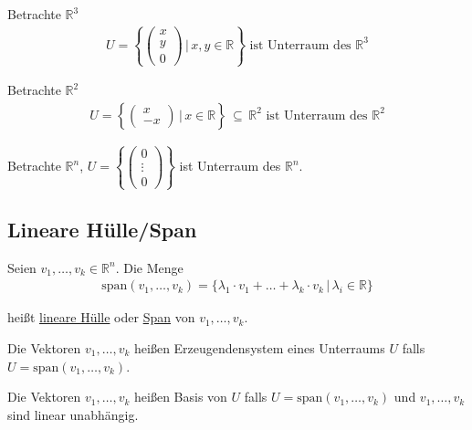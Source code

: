 Betrachte $\mathbb{R}^3$
\begin{align*}
	U = \left\{\begin{pmatrix}x \\ y \\ 0\end{pmatrix}\,\Bigg|\,x,y \in \mathbb{R}\right\}\text{ ist Unterraum des }\mathbb{R}^3
\end{align*}

Betrachte $\mathbb{R}^2$
\begin{align*}
	U = \left\{\begin{pmatrix}x \\ -x\end{pmatrix}\,\Bigg|\,x \in \mathbb{R}\right\}\,\subseteq\,\mathbb{R}^2\text{ ist Unterraum des }\mathbb{R}^2
\end{align*}

\begin{center}
\end{center}

Betrachte $\mathbb{R}^n$, $U = \left\{\begin{pmatrix}0 \\ \vdots \\ 0\end{pmatrix}\right\}$ ist Unterraum des $\mathbb{R}^n$.

\subsection{Lineare Hülle/Span}
Seien $v_1,\dots,v_k \in \mathbb{R}^n$. Die Menge
\begin{align*}
	\text{span}(v_1,\dots,v_k) = \{\lambda _1 \cdot v_1+\dots+\lambda _k \cdot v_k\,|\,\lambda _i \in \mathbb{R}\}
\end{align*}

heißt \underline{lineare Hülle} oder \underline{Span} von $v_1,\dots,v_k$.

Die Vektoren $v_1,\dots,v_k$ heißen Erzeugendensystem eines Unterraums $U$ falls $U = \text{span}(v_1,\dots,v_k)$.

Die Vektoren $v_1,\dots,v_k$ heißen Basis von $U$ falls $U = \text{span}(v_1,\dots,v_k)$ und $v_1,\dots,v_k$ sind linear unabhängig.
